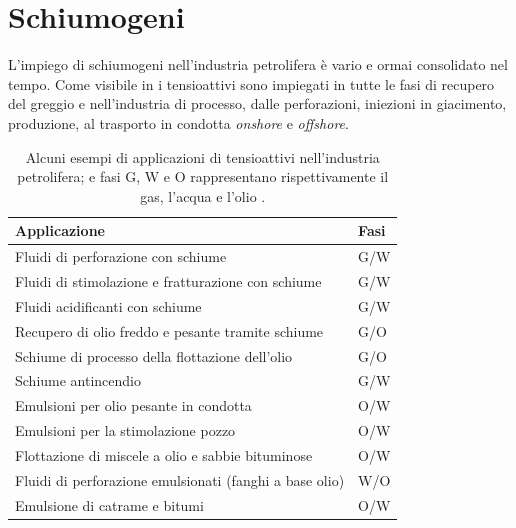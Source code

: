 \section{Schiumogeni}
L'impiego di schiumogeni nell'industria petrolifera è vario e ormai consolidato nel tempo. Come visibile in  i tensioattivi sono impiegati in tutte le fasi di recupero del greggio e nell'industria di processo, dalle perforazioni, iniezioni in giacimento, produzione, al trasporto in condotta \textit{onshore} e \textit{offshore}.

\begin{table}[htbp]
    \small
    \centering
    \caption{Alcuni esempi di applicazioni di tensioattivi nell'industria petrolifera; e fasi G, W e O rappresentano rispettivamente il gas, l'acqua e l'olio \parencite{schramm2006emulsions}.}
    \label{tab:surfactantapplications}
\begin{tabular}{p{}p{}}
\hline
{\bf Applicazione}                                                         & {\textbf{Fasi}}           \\ \hline
Fluidi di perforazione con schiume                                         & G/W                    \\
Fluidi di stimolazione e fratturazione con schiume                         & G/W                    \\
Fluidi acidificanti con schiume                                            & G/W                    \\
Recupero di olio freddo e pesante tramite schiume                          & G/O                    \\
Schiume di processo della flottazione dell'olio                            & G/O                    \\
Schiume antincendio                                                        & G/W                    \\
Emulsioni per olio pesante in condotta                                     & O/W                    \\
Emulsioni per la stimolazione pozzo                                        & O/W                    \\
Flottazione di miscele a olio e sabbie bituminose                          & O/W                    \\
Fluidi di perforazione emulsionati (fanghi a base olio)                    & W/O                    \\
Emulsione di catrame e bitumi                                              & O/W                    \\

\end{tabular}
\end{table}
